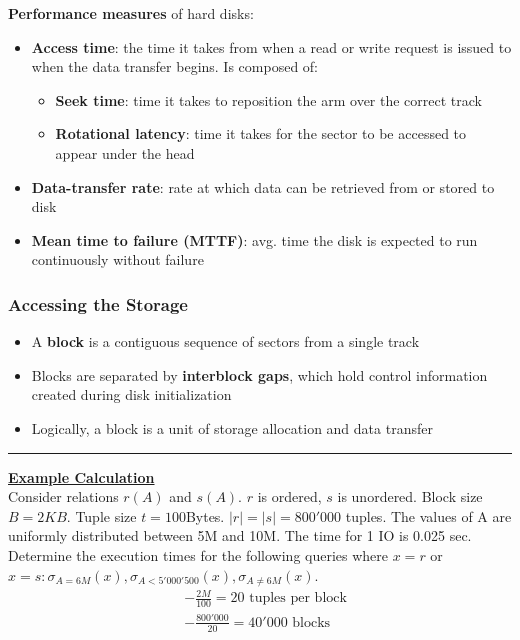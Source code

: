 \textbf{Performance measures} of hard disks:
\begin{itemize}[label=\(\rhd\)]
    \item \textbf{Access time}: the time it takes from when a read or write request is issued to when the data transfer begins. Is composed of:
    \begin{itemize}[label=\(\rhd\)]
        \item \textbf{Seek time}: time it takes to reposition the arm over the correct track 
        \item \textbf{Rotational latency}: time it takes for the sector to be accessed to appear under the head
    \end{itemize}
    \item \textbf{Data-transfer rate}: rate at which data can be retrieved from or stored to disk
    \item \textbf{Mean time to failure (MTTF)}: avg. time the disk is expected to run continuously without failure
\end{itemize}

\subsubsection{Accessing the Storage}
\begin{itemize}[label=\(\rhd\)]
    \item A \textbf{block} is a contiguous sequence of sectors from a single track
    \item Blocks are separated by \textbf{interblock gaps}, which hold control information created during disk initialization
    \item Logically, a block is a unit of storage allocation and data transfer
\end{itemize}

\rule{\linewidth}{0.4pt}

\textbf{\underline{Example Calculation}}\\
Consider relations $r(A)$ and $s(A)$. $r$ is ordered, $s$ is unordered. Block size $B=2KB$. Tuple size $t=100$Bytes. $|r|=|s|=800'000$ tuples. The values of A are uniformly distributed between 5M and 10M. The time for 1 IO is 0.025 sec. Determine the execution times for the following queries where $x=r$ or $x=s: \sigma_{A=6M}(x), \sigma_{A<5'000'500}(x), \sigma_{A\neq 6M}(x)$.
\begin{align*}
    &- \frac{2M}{100} = 20 \text{ tuples per block} \\
    &- \frac{800'000}{20} = 40'000 \text{ blocks}
\end{align*}

